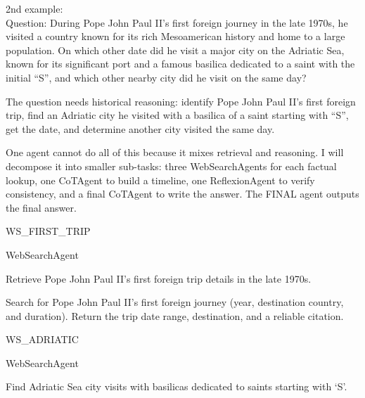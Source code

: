 \begin{userprompt}[title={User Prompt}]
2nd example:\\

Question: During Pope John Paul II's first foreign journey in the late 1970s, he visited a country known for its rich Mesoamerican history and home to a large population. On which other date did he visit a major city on the Adriatic Sea, known for its significant port and a famous basilica dedicated to a saint with the initial “S”, and which other nearby city did he visit on the same day?\\



The question needs historical reasoning: identify Pope John Paul II's first foreign trip, find an Adriatic city he visited with a basilica of a saint starting with “S”, get the date, and determine another city visited the same day.

One agent cannot do all of this because it mixes retrieval and reasoning.
I will decompose it into smaller sub-tasks: three WebSearchAgents for each factual lookup, one CoTAgent to build a timeline, one ReflexionAgent to verify consistency, and a final CoTAgent to write the answer.
The FINAL agent outputs the final answer.



\quad{}WS\_FIRST\_TRIP

\quad{}WebSearchAgent

\quad{}
Retrieve Pope John Paul II's first foreign trip details in the late 1970s.

\quad{}

\qquad{}
Search for Pope John Paul II's first foreign journey (year, destination country, and duration).
Return the trip date range, destination, and a reliable citation.

\quad{}



\quad{}WS\_ADRIATIC

\quad{}WebSearchAgent

\quad{}
Find Adriatic Sea city visits with basilicas dedicated to saints starting with `S'.


\end{userprompt}
